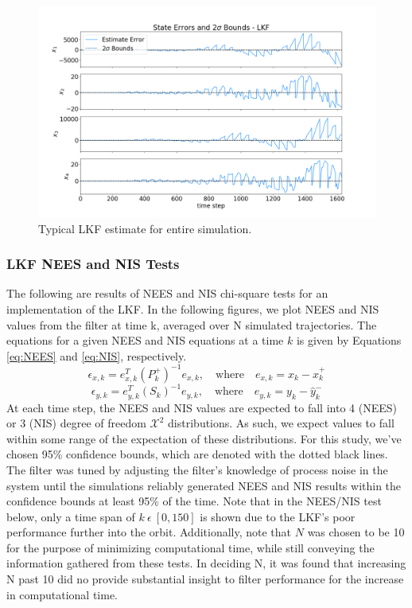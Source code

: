 \documentclass[11pt, a4paper]{article}
\begin{document}
\begin{figure}[H]
	\centering
	\includegraphics[width=\textwidth]{Figures/lkf_estimate_th.png}
	\caption{Typical LKF estimate for entire simulation.}
	\label{fig:lkf_est}
\end{figure}

\subsubsection{LKF NEES and NIS Tests}
The following are results of NEES and NIS chi-square tests for an implementation of the LKF. 
In the following figures, we plot NEES and NIS values from the filter at time k, averaged over N simulated trajectories. 
The equations for a given NEES and NIS equations at a time $k$ is given by Equations \ref{eq:NEES} and \ref{eq:NIS}, respectively.
\begin{equation}
	\epsilon_{x,k} = e^T_{x,k} (P^+_k)^{-1} e_{x,k},
	\quad \text{where} \quad
	e_{x,k} = x_k - \hat{x}^+_k
	\label{eq:NEES}
\end{equation}
\begin{equation}
	\epsilon_{y,k} = e^T_{y,k} (S_k)^{-1} e_{y,k},
	\quad \text{where} \quad
	e_{y,k} = y_k - \hat{y}^-_k
	\label{eq:NIS}
\end{equation}
At each time step, the NEES and NIS values are expected to fall into 4 (NEES) or 3 (NIS) degree of freedom $\mathcal{X}^2$ distributions. 
As such, we expect values to fall within some range of the expectation of these distributions. 
For this study, we've chosen 95\% confidence bounds, which are denoted with the dotted black lines. 
The filter was tuned by adjusting the filter's knowledge of process noise in the system until the simulations reliably generated NEES and NIS results within the confidence bounds at least 95\% of the time. 
Note that in the NEES/NIS test below, only a time span of $k\ \epsilon\ [0, 150]$ is shown due to the LKF's poor performance further into the orbit. 
Additionally, note that $N$ was chosen to be 10 for the purpose of minimizing computational time, while still conveying the information gathered from these tests. In deciding N, it was found that increasing N past 10 did no provide substantial insight to filter performance for the increase in computational time. 
\end{document}
